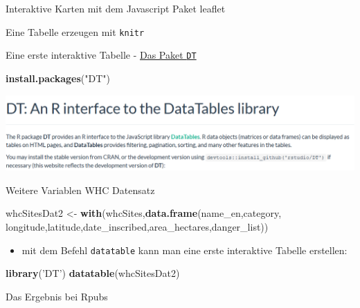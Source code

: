 \documentclass[ignorenonframetext,]{beamer}
\newenvironment{Shaded}{}{}
\newcommand{\KeywordTok}[1]{\textcolor[rgb]{0.00,0.44,0.13}{\textbf{{#1}}}}
\newcommand{\StringTok}[1]{\textcolor[rgb]{0.25,0.44,0.63}{{#1}}}
\newcommand{\NormalTok}[1]{{#1}}
\providecommand{\tightlist}{%
\setlength{\itemsep}{0pt}\setlength{\parskip}{0pt}}
\begin{document}
\begin{frame}[fragile]{Interaktive Karten mit dem Javascript Paket
leaflet}
\begin{block}{Eine Tabelle erzeugen mit \texttt{knitr}}
\end{block}

\begin{block}{Eine erste interaktive Tabelle -
\href{https://rstudio.github.io/DT/}{Das Paket \texttt{DT}}}

\begin{Shaded}
\begin{Highlighting}[]
\KeywordTok{install.packages}\NormalTok{(}\StringTok{"DT"}\NormalTok{)}
\end{Highlighting}
\end{Shaded}

\includegraphics{./tex2pdf.9796/7752297de29c10259795463db8e6056992088da7.png}

\end{block}

\begin{block}{Weitere Variablen WHC Datensatz}

\begin{Shaded}
\begin{Highlighting}[]
\NormalTok{whcSitesDat2 <-}\StringTok{ }\KeywordTok{with}\NormalTok{(whcSites,}\KeywordTok{data.frame}\NormalTok{(name_en,category,}
                                         \NormalTok{longitude,latitude,date_inscribed,area_hectares,danger_list))}
\end{Highlighting}
\end{Shaded}

\begin{itemize}
\tightlist
\item
  mit dem Befehl \texttt{datatable} kann man eine erste interaktive
  Tabelle erstellen:
\end{itemize}

\begin{Shaded}
\begin{Highlighting}[]
\KeywordTok{library}\NormalTok{(}\StringTok{'DT'}\NormalTok{)}
\KeywordTok{datatable}\NormalTok{(whcSitesDat2)}
\end{Highlighting}
\end{Shaded}

\end{block}

\begin{block}{Das Ergebnis bei Rpubs}


\end{block}
\end{frame}
\end{document}

